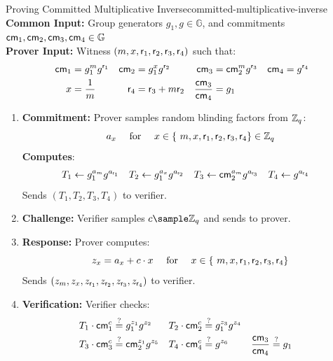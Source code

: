 \begin{protocol}{Proving Committed Multiplicative Inverse}{committed-multiplicative-inverse}\label{pok-committed-multiplicative-inverse}
\textbf{Common Input:} Group generators $g_1, g \in \mathbb{G}$, and commitments $\mathsf{cm}_1, \mathsf{cm}_2, \mathsf{cm}_3, \mathsf{cm}_4 \in \mathbb{G}$\\
\textbf{Prover Input:} Witness $(m, x, \mathsf{r}_1, \mathsf{r}_2, \mathsf{r}_3, \mathsf{r}_4)$ such that:
    \begin{align*}
        \mathsf{cm}_1 &= g_1^m g^{\mathsf{r}_1}     &    \mathsf{cm}_2 &= g_1^x g^{\mathsf{r}_2}  &   \mathsf{cm}_3 &= \mathsf{cm}_2^m g^{\mathsf{r}_3} & \mathsf{cm}_4 &= g^{\mathsf{r}_4}\\
         x &= \frac{1}{m}     &   \mathsf{r}_4 &= \mathsf{r}_3 + m \mathsf{r}_2 & \frac{\mathsf{cm}_3}{\mathsf{cm}_4} &= g_1
    \end{align*}
\begin{enumerate}
    \item \textbf{Commitment:} Prover samples random blinding factors from $\mathbb{Z}_q$:
       \[
        a_x \quad \text{ for } \quad x \in \{\ m, x, \mathsf{r}_1, \mathsf{r}_2, \mathsf{r}_3, \mathsf{r}_4\} \in \mathbb{Z}_q
        \]
    \textbf{Computes}:
    \begin{align*}
        T_1 &\gets g_1^{a_m} g^{a_{\mathsf{r}_1}}  &   T_2 &\gets g_1^{a_x} g^{a_{\mathsf{r}_2}}     &   T_3 &\gets \mathsf{cm}_2^{a_m} g^{a_{\mathsf{r}_3}} & T_4 &\gets g^{a_{\mathsf{r}_4}}
    \end{align*}
    Sends $(T_1, T_2, T_3, T_4)$ to verifier.
    
    \item \textbf{Challenge:} Verifier samples $c \sample \mathbb{Z}_q$ and sends to prover.
    
    \item \textbf{Response:} Prover computes:
    \[
    z_x = a_x + c \cdot x \quad \text{ for } \quad x \in \{\ m, x, \mathsf{r}_1, \mathsf{r}_2, \mathsf{r}_3, \mathsf{r}_4\} 
    \]
    Sends $(z_m, z_x, z_{\mathsf{r}_1}, z_{\mathsf{r}_2}, z_{\mathsf{r}_3}, z_{\mathsf{r}_4})$ to verifier.
    
    \item \textbf{Verification:} Verifier checks:
    \begin{align*}
         T_1 \cdot \mathsf{cm}_1^c &\stackrel{?}{=}  g_1^{z_1} g^{z_2}
        & 
         T_2 \cdot \mathsf{cm}_2^c &\stackrel{?}{=}  g_1^{z_3} g^{z_4}\\
        T_3 \cdot \mathsf{cm}_3^c &\stackrel{?}{=} \mathsf{cm}_2^{z_1} g^{z_5}
        &
        T_4 \cdot \mathsf{cm}_4^c &\stackrel{?}{=}  g^{z_6} 
        &
        \frac{\mathsf{cm}_3}{\mathsf{cm}_4} &\stackrel{?}{=} g_1
    \end{align*}
\end{enumerate}
\end{protocol}

